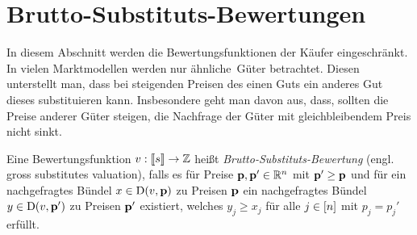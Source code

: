 \section{Brutto-Substituts-Bewertungen}\label{sec-gross-substitutes}

In diesem Abschnitt werden die Bewertungsfunktionen der Käufer eingeschränkt.
In vielen Marktmodellen werden nur \glqq ähnliche\grqq\ Güter betrachtet.
Diesen unterstellt man, dass bei steigenden Preisen des einen Guts ein anderes Gut dieses substituieren kann.
Insbesondere geht man davon aus, dass, sollten die Preise anderer Güter steigen, die Nachfrage der Güter mit gleichbleibendem Preis nicht sinkt.

\iffalse
\begin{definition}[Diskret-Konkave Funktion]
	Eine Funktion $v: \ffirst{\fs}^n \rightarrow \Z$ heißt \emph{diskret-konkav}, falls lokale Minima auch global minimal sind, also falls für alle Preise $\fp\in\R^n$ und Bündel $x\in\ffirst{\fs}^n$ mit \begin{align*}
	&v(x) \geq \max_{i : x_i>0} v(x - e_i) + p_i, \qquad
	&v(x) \geq \max_{j:x_j < s_j} v(x + e_j) - p_j, \\
	&v(x) \geq \max_{\substack{i: x_i>0 \\ j: x_j < s_j}} v(x + e_i - e_j) - p_i + p-j
	\end{align*}
	bereits $x\in\NB(v, \fp)$ gilt.
\end{definition}
\fi

\begin{definition}
Eine Bewertungsfunktion $v: \left\llbracket s \right\rrbracket \rightarrow \mathbb{Z}$ heißt \emph{Brutto-Substituts-Bewertung} (engl. gross substitutes valuation), falls es für Preise $\mathbf{p},\mathbf{p}' \in\mathbb{R}^n$ mit $\mathbf{p}' \geq \mathbf{p}$ und für ein nachgefragtes Bündel $x\in\NB(v, \fp)$ zu Preisen $\mathbf{p}$ ein nachgefragtes Bündel $y\in\operatorname{D}(v,\mathbf{p}')$ zu Preisen $\mathbf{p}'$ existiert, welches $y_j \geq x_j$ für alle $j\in\left[ n \right]$ mit $p_j = p_j'$ erfüllt.
\end{definition}

